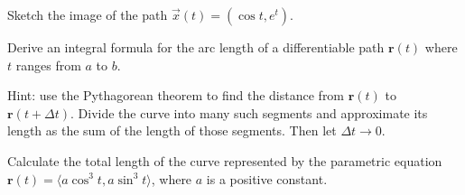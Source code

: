 \documentclass{watsonbook}
\begin{document}
\begin{aexercise}
  Sketch the image of the path $\vec{x}(t)=(\cos t, e^t)$.
\end{aexercise}

\begin{aexercise}
  Derive an integral formula for the arc length of a differentiable
  path $\mathbf{r}(t)$ where $t$ ranges from $a$ to $b$.

  Hint: use the Pythagorean theorem to find the distance from
  $\mathbf{r}(t)$ to $\mathbf{r}(t+\Delta t)$. Divide the curve into
  many such segments and approximate its length as the sum of the
  length of those segments. Then let $\Delta t \to 0$. 
\end{aexercise}

\begin{aexercise}
  Calculate the total length of the curve represented by the
  parametric equation $\mathbf{r}(t) = \langle a\cos^3t, a\sin^3 t \rangle$,
  where $a$ is a positive constant.
\end{aexercise}
\end{document}
